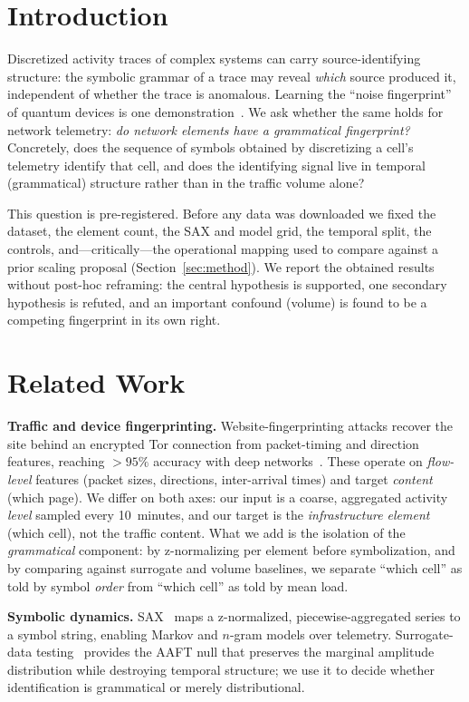 \documentclass[conference]{IEEEtran}
\begin{document}
\section{Introduction}
Discretized activity traces of complex systems can carry source-identifying
structure: the symbolic grammar of a trace may reveal \emph{which} source
produced it, independent of whether the trace is anomalous. Learning the
``noise fingerprint'' of quantum devices is one demonstration~\cite{martina2022noise}.
We ask whether the same holds for network telemetry: \emph{do network elements
have a grammatical fingerprint?} Concretely, does the sequence of symbols
obtained by discretizing a cell's telemetry identify that cell, and does the
identifying signal live in temporal (grammatical) structure rather than in the
traffic volume alone?

This question is pre-registered. Before any data was downloaded we fixed the
dataset, the element count, the SAX and model grid, the temporal split, the
controls, and---critically---the operational mapping used to compare against a
prior scaling proposal (Section~\ref{sec:method}). We report the obtained
results without post-hoc reframing: the central hypothesis is supported, one
secondary hypothesis is refuted, and an important confound (volume) is found to
be a competing fingerprint in its own right.

\section{Related Work}
\textbf{Traffic and device fingerprinting.} Website-fingerprinting attacks
recover the site behind an encrypted Tor connection from packet-timing and
direction features, reaching $>95\%$ accuracy with deep
networks~\cite{sirinam2018deep,rimmer2018automated}. These operate on
\emph{flow-level} features (packet sizes, directions, inter-arrival times) and
target \emph{content} (which page). We differ on both axes: our input is a
coarse, aggregated activity \emph{level} sampled every 10~minutes, and our
target is the \emph{infrastructure element} (which cell), not the traffic
content. What we add is the isolation of the \emph{grammatical} component:
by z-normalizing per element before symbolization, and by comparing against
surrogate and volume baselines, we separate ``which cell'' as told by symbol
\emph{order} from ``which cell'' as told by mean load.

\textbf{Symbolic dynamics.} SAX~\cite{lin2007sax} maps a z-normalized,
piecewise-aggregated series to a symbol string, enabling Markov and $n$-gram
models over telemetry. Surrogate-data testing~\cite{theiler1992surrogate}
provides the AAFT null that preserves the marginal amplitude distribution while
destroying temporal structure; we use it to decide whether identification is
grammatical or merely distributional.
\end{document}
